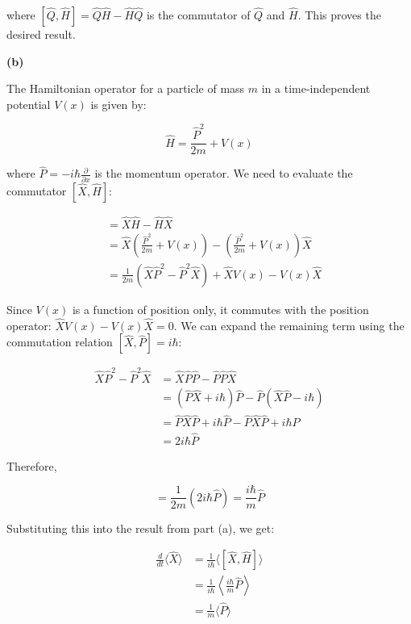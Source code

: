 \documentclass{article}
\begin{document}
where $[\hat{Q}, \hat{H}] = \hat{Q} \hat{H} - \hat{H} \hat{Q}$ is the commutator of $\hat{Q}$ and $\hat{H}$. This proves the desired result.


\textbf{(b)} 

The Hamiltonian operator for a particle of mass $m$ in a time-independent potential $V(x)$ is given by:

\begin{equation*}
\hat{H} = \frac{\hat{P}^2}{2m} + V(x)
\end{equation*}

where $\hat{P} = -i\hbar \frac{\partial}{\partial x}$ is the momentum operator. We need to evaluate the commutator $[\hat{X}, \hat{H}]$:

\begin{align*}
[\hat{X}, \hat{H}] &= \hat{X} \hat{H} - \hat{H} \hat{X} \\
&= \hat{X} \left( \frac{\hat{P}^2}{2m} + V(x) \right) - \left( \frac{\hat{P}^2}{2m} + V(x) \right) \hat{X} \\
&= \frac{1}{2m} \left( \hat{X} \hat{P}^2 - \hat{P}^2 \hat{X} \right) + \hat{X} V(x) - V(x) \hat{X} 
\end{align*}

Since $V(x)$ is a function of position only, it commutes with the position operator: $\hat{X} V(x) - V(x) \hat{X} = 0$.  We can expand the remaining term using the commutation relation $[\hat{X}, \hat{P}] = i\hbar$:

\begin{align*}
\hat{X} \hat{P}^2 - \hat{P}^2 \hat{X} &= \hat{X} \hat{P} \hat{P} - \hat{P} \hat{P} \hat{X} \\
&= (\hat{P} \hat{X} + i\hbar) \hat{P} - \hat{P} (\hat{X} \hat{P} - i\hbar) \\
&= \hat{P} \hat{X} \hat{P} + i\hbar \hat{P} - \hat{P} \hat{X} \hat{P} + i\hbar \hat{P} \\
&= 2i\hbar \hat{P}
\end{align*}

Therefore,

\begin{equation*}
[\hat{X}, \hat{H}] = \frac{1}{2m} (2i\hbar \hat{P}) = \frac{i\hbar}{m} \hat{P}
\end{equation*}

Substituting this into the result from part (a), we get:

\begin{align*}
\frac{d}{dt} \langle \hat{X} \rangle &= \frac{1}{i\hbar} \langle [\hat{X}, \hat{H}] \rangle \\
&= \frac{1}{i\hbar} \left\langle \frac{i\hbar}{m} \hat{P} \right\rangle \\
&= \frac{1}{m} \langle \hat{P} \rangle
\end{align*}
\end{document}
